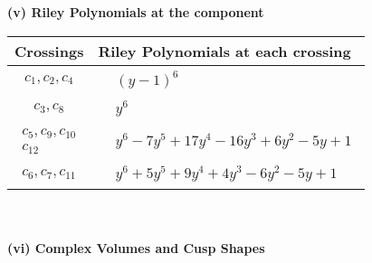 \documentclass[1p]{elsarticle_modified}
\theoremstyle{definition}
\begin{document}
\newpage\renewcommand{\arraystretch}{1}
\flushleft \textbf{(v) Riley Polynomials at the component}\newline \\
\begin{tabular}{m{50pt}|m{274pt}}
Crossings & \hspace{64pt}Riley Polynomials at each crossing \\
\hline $$\begin{aligned}c_{1},c_{2},c_{4}\end{aligned}$$&$\begin{aligned}
&(y-1)^6
\end{aligned}$\\
\hline $$\begin{aligned}c_{3},c_{8}\end{aligned}$$&$\begin{aligned}
&y^6
\end{aligned}$\\
\hline $$\begin{aligned}c_{5},c_{9},c_{10}\\c_{12}\end{aligned}$$&$\begin{aligned}
&y^6-7 y^5+17 y^4-16 y^3+6 y^2-5 y+1
\end{aligned}$\\
\hline $$\begin{aligned}c_{6},c_{7},c_{11}\end{aligned}$$&$\begin{aligned}
&y^6+5 y^5+9 y^4+4 y^3-6 y^2-5 y+1
\end{aligned}$\\
\hline
\end{tabular}\\~\\
\newpage\flushleft \textbf{(vi) Complex Volumes and Cusp Shapes}
\end{document}
